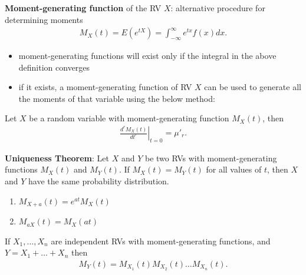 \documentclass[10pt]{article}
\begin{document}
\begin{definition}
    \textbf{Moment-generating function} of the RV $X $: alternative procedure for determining moments 
    \begin{gather*}
        M_X(t) = E(e^{tX}) = \int_{-\infty}^{\infty} e^{tx} f(x) dx 
    .\end{gather*}
\end{definition}
\begin{itemize}
    \item moment-generating functions will exist only if the integral in the above definition converges 
    \item if it exists, a moment-generating function of RV $X$ can be used to generate all the moments of that variable using the below method:
\end{itemize}
\begin{theorem}
    Let $X$ be a random variable with moment-generating function $M_X(t)$, then 
    \begin{gather*}
        \left. \frac{d^r M_X(t)}{d t^r} \right|_{t=0} = \mu'_r
    .\end{gather*}
\end{theorem}
\begin{theorem}
    \textbf{Uniqueness Theorem}: Let $X$ and $Y$ be two RVs with moment-generating functions $M_X(t)$ and $M_Y(t)$. If $M_X(t)=M_Y(t)$ for all values of $t$, then $X$ and $Y$ have the same probability distribution.
\end{theorem}
\begin{theorem}
    \begin{enumerate}
        \item $M_{X+a}(t) = e^{at}M_X(t)$ 
        \item $M_{aX}(t) = M_X(at)$
    \end{enumerate}
\end{theorem}
\begin{theorem}
    If $X_1, \ldots, X_n$ are independent RVs with moment-generating functions, and $Y = X_1 + \ldots + X_n$ then 
    \begin{gather*}
        M_Y(t) = M_{X_1}(t)M_{X_2}(t)\ldots M_{X_n}(t)
    .\end{gather*}
\end{theorem}
\end{document}
